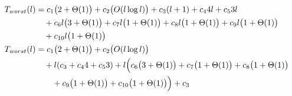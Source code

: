 \begin{subequations}
\label{eq:mergelines-merge-1}
\begin{align}
\label{eq:mergelines-merge-1-1}
T_{worst}(l)& =
c_{1}\bigl(2 + \Theta(1)\bigr)
+ c_{2}\bigl(O(l \log l)\bigr)
+ c_{3}(l + 1)
+ c_{4}4l
+ c_{5}3l
\\
& \quad
+ c_{6}l\bigl(3 + \Theta(1)\bigr)
+ c_{7}l\bigl(1 + \Theta(1)\bigr)
+ c_{8}l\bigl(1 + \Theta(1)\bigr)
+ c_{9}l\bigl(1 + \Theta(1)\bigr)
\nonumber \\
& \quad
+ c_{10}l\bigl(1 + \Theta(1)\bigr)
\nonumber \\
\label{eq:mergelines-merge-1-2}
T_{worst}(l)& =
c_{1}\bigl(2 + \Theta(1)\bigr) + c_{2}\bigl(O(l \log l)\bigr)
\\
& \quad
+ l(c_{3} + c_{4}4 + c_{5}3)
+ l\Bigl(c_{6}\bigl(3 + \Theta(1)\bigr) + c_{7}\bigl(1 + \Theta(1)\bigr) + c_{8}\bigl(1 + \Theta(1)\bigr)
\nonumber \\
& \quad \quad
+ c_{9}\bigl(1 + \Theta(1)\bigr) + c_{10}\bigl(1 + \Theta(1)\bigr)\Bigr) + c_{3}
\nonumber
\end{align}
\end{subequations}
